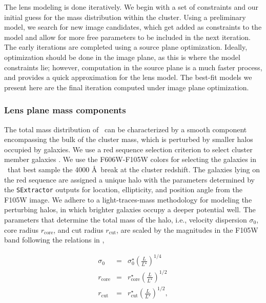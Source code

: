 The lens modeling is done iteratively. We begin with a set of constraints and our initial guess for the mass distribution within the cluster. Using a preliminary model, we search for new image candidates, which get added as constraints to the model and allow for more free parameters to be included in the next iteration. The early iterations are completed using a source plane optimization. Ideally, optimization should be done in the image plane, as this is where the model constraints lie; however, computation in the source plane is a much faster process, and provides a quick approximation for the lens model. The best-fit models we present here are the final iteration computed under image plane optimization.

\subsubsection{Lens plane mass components}
The total mass distribution of \cluster\ can be characterized by a smooth component encompassing the bulk of the cluster mass, which is perturbed by smaller halos occupied by galaxies. We use a red sequence selection criterion to select cluster member galaxies \citep[i.e.,][]{Gladders:2000kq}. We use the F606W-F105W colors for selecting the galaxies in \cluster\ that best sample the 4000 \AA\ break at the cluster redshift. The galaxies lying on the red sequence are assigned a unique halo with the parameters determined by the \texttt{SExtractor} \citep{Bertin:1996ly} outputs for location, ellipticity, and position angle from the F105W image. We adhere to a light-traces-mass methodology for modeling the perturbing halos, in which brighter galaxies occupy a deeper potential well. The parameters that determine the total mass of the halo, i.e., velocity dispersion $\sigma_0$, core radius $r_\mathrm{core}$, and cut radius $r_\mathrm{cut}$, are scaled by the magnitudes in the F105W band following the relations in \citet{Jullo:2007lr},

\begin{eqnarray}
\sigma_0 &=&  \sigma_0^\star \left(\frac{L}{L^\star}\right)^{1/4} \\
r_\mathrm{core} &=& r_\mathrm{core}^\star  \left(\frac{L}{L^\star}\right)^{1/2} \\
r_\mathrm{cut} &=& r_\mathrm{cut}^\star  \left(\frac{L}{L^\star}\right)^{1/2},
\end{eqnarray}

